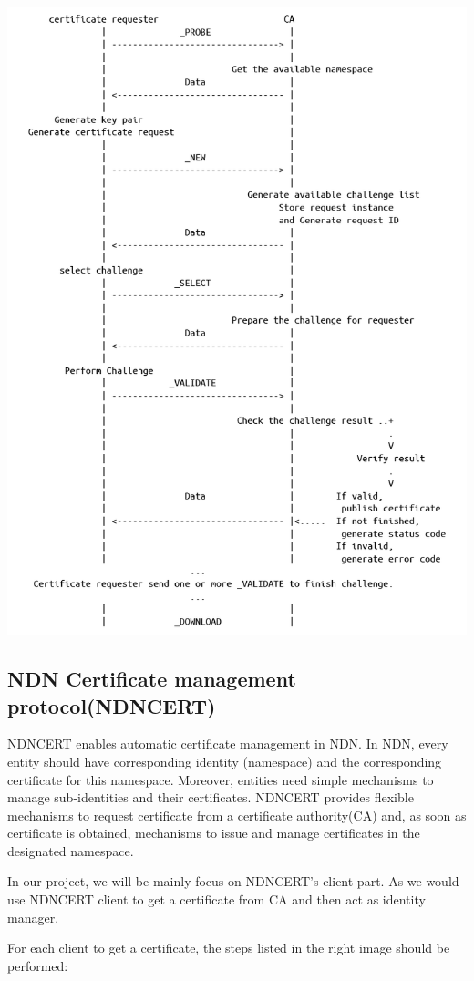 \documentclass[a0,portrait]{poster}
\begin{document}
\begin{multicols}{2}
\begin{minipage}[b]{0.45\linewidth}
	\includegraphics[width=\linewidth]{figures/protocol.png}
\end{minipage}

\subsection*{NDN Certificate management protocol(NDNCERT)\cite{zhang2017ndncert}}
\par
	NDNCERT enables automatic certificate management in NDN. 
	In NDN, every entity should have corresponding identity (namespace) and the corresponding certificate for this namespace. 
	Moreover, entities need simple mechanisms to manage sub-identities and their certificates. 
	NDNCERT provides flexible mechanisms to request certificate from a certificate authority(CA) and, as soon as certificate is obtained, mechanisms to issue and manage certificates in the designated namespace.
\par
	In our project, we will be mainly focus on NDNCERT's client part. 
	As we would use NDNCERT client to get a certificate from CA and then act as identity manager.
\par
	For each client to get a certificate, the steps listed in the right image should be performed:


\end{multicols}
\end{document}
